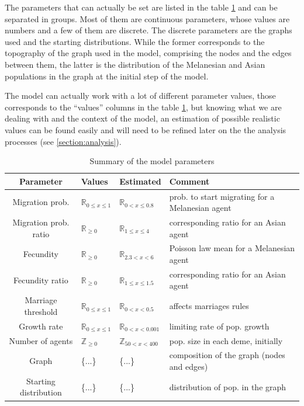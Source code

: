 \documentclass[a4paper,12pt]{report}
\begin{document}
The parameters that can actually be set are listed in the table \ref{parameters} and can be separated in groups. Most of them are continuous parameters, whose values are numbers and a few of them are discrete. The discrete parameters are the graphs used and the starting distributions. While the former corresponds to the topography of the graph used in the model, comprising the nodes and the edges between them, the latter is the distribution of the Melanesian and Asian populations in the graph at the initial step of the model.

The model can actually work with a lot of different parameter values, those corresponds to the “values” columns in the table \ref{parameters}, but knowing what we are dealing with and the context of the model, an estimation of possible realistic values can be found easily and will need to be refined later on the the analysis processes (see \ref{section:analysis}).

\begin{table}
	\hspace*{-1cm}
	\begin{tabular}{|c|l|l|l|}
		\hline
 		Parameter & Values & Estimated & Comment \\ \hline
        Migration prob. & $\mathbb{R}_{0 \leq x \leq 1}$ & $\mathbb{R}_{0 < x \leq 0.8}$ & prob. to start migrating for a Melanesian agent \\ \hline
        Migration prob. ratio & $\mathbb{R}_{\geq 0}$ & $\mathbb{R}_{1 \leq x \leq 4}$ & corresponding ratio for an Asian agent \\ \hline
        Fecundity & $\mathbb{R}_{\geq 0}$ & $\mathbb{R}_{2.3 < x < 6}$ & Poisson law mean for a Melanesian agent \\ \hline
        Fecundity ratio & $\mathbb{R}_{\geq 0}$ & $\mathbb{R}_{1 \leq x \leq 1.5}$ & corresponding ratio for an Asian agent \\ \hline
        Marriage threshold & $\mathbb{R}_{0 \leq x \leq 1}$ & $\mathbb{R}_{0 < x < 0.5}$ & affects marriages rules \\ \hline
        Growth rate & $\mathbb{R}_{0 \leq x \leq 1}$ & $\mathbb{R}_{0 < x < 0.001}$ & limiting rate of pop. growth \\ \hline
        Number of agents & $\mathbb{Z}_{\geq 0}$ & $\mathbb{Z}_{50 < x < 400}$ & pop. size in each deme, initially \\ \hline
        Graph & \{...\} & \{...\} & composition of the graph (nodes and edges) \\ \hline
        Starting distribution & \{...\} & \{...\} & distribution of pop. in the graph \\ \hline
	\end{tabular}
	\caption{Summary of the model parameters}
	\label{parameters}
\end{table}
\end{document}
